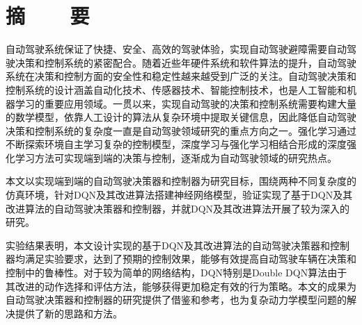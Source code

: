 %
%
%
%
%

\vspace*{-11mm}

\begin{center}
  \heiti{}\textbf{\thesisTitle}
\end{center}

\vspace*{2mm}

{\let\clearpage\relax \chapter*{\textmd{摘~~~~要}}}
\setcounter{page}{1}

\vspace*{1mm}

\setlength{\parskip}{0em}

自动驾驶系统保证了快捷、安全、高效的驾驶体验，实现自动驾驶避障需要自动驾驶决策和控制系统的紧密配合。随着近些年硬件系统和软件算法的提升，自动驾驶系统在决策和控制方面的安全性和稳定性越来越受到广泛的关注。自动驾驶决策和控制系统的设计涵盖自动化技术、传感器技术、智能控制技术，也是人工智能和机器学习的重要应用领域。一贯以来，实现自动驾驶的决策和控制系统需要构建大量的数学模型，依靠人工设计的算法从复杂环境中提取关键信息，因此降低自动驾驶决策和控制系统的复杂度一直是自动驾驶领域研究的重点方向之一。强化学习通过不断探索环境自主学习复杂的控制模型，深度学习与强化学习相结合形成的深度强化学习方法可实现端到端的决策与控制，逐渐成为自动驾驶领域的研究热点。

本文以实现端到端的自动驾驶决策器和控制器为研究目标，围绕两种不同复杂度的仿真环境，针对DQN及其改进算法搭建神经网络模型，验证实现了基于DQN及其改进算法的自动驾驶决策器和控制器，并就DQN及其改进算法开展了较为深入的研究。

实验结果表明，本文设计实现的基于DQN及其改进算法的自动驾驶决策器和控制器均满足实验要求，达到了预期的控制效果，能够有效提高自动驾驶车辆在决策和控制中的鲁棒性。对于较为简单的网络结构，DQN特别是Double DQN算法由于其改进的动作选择和评估方法，能够获得更加稳定有效的行为策略。本文的成果为自动驾驶决策器和控制器的研究提供了借鉴和参考，也为复杂动力学模型问题的解决提供了新的思路和方法。

